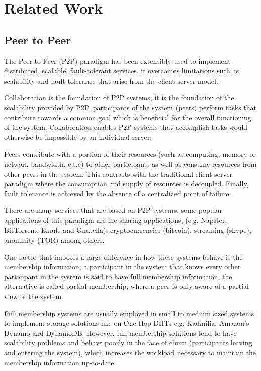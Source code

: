 \chapter{Related Work}
\label{cha:related_work}


\section{Peer to Peer} %
\label{sec:p2p}

The Peer to Peer (P2P) paradigm has been extensibly used to implement distributed, scalable, fault-tolerant services, it overcomes limitations such as scalability and fault-tolerance that arise from the client-server model. 

Collaboration is the foundation of P2P systems, it is the foundation of the scalability provided by P2P. participants of the system (peers) perform tasks that contribute towards a common goal which is beneficial for the overall functioning of the system. Collaboration enables P2P systems that accomplish tasks would otherwise be impossible by an individual server. 

Peers contribute with a portion of their resources (such as computing, memory or network bandwidth, e.t.c) to other participants as well as consume resources from other peers in the system. This contrasts with the traditional client-server paradigm where the consumption and supply of resources is decoupled. Finally, fault tolerance is achieved by the absence of a centralized point of failure.

There are many services that are based on P2P systems, some popular applications of this paradigm are file sharing applications, (e.g. Napster, BitTorrent, Emule and Gnutella), cryptocurrencies (bitcoin), streaming (skype), anonimity (TOR) among others. 

One factor that imposes a large difference in how these systems behave is the membership information, a participant in the system that knows every other participant in the system is said to have full membership information, the alternative is called partial membership, where a peer is only aware of a partial view of the system.

Full membership systems are usually employed in small to medium sized systems to implement storage solutions like on One-Hop DHTs e.g. Kadmilia, Amazon's Dynamo and DynamoDB. However, full membership solutions tend to have scalability problems and behave poorly in the face of churn (participants leaving and entering the system), which increases the workload necessary to maintain the membership information up-to-date. 

